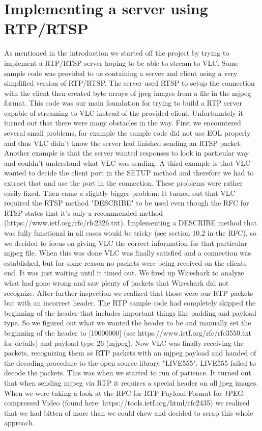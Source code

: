 \documentclass[a4paper]{article}
\begin{document}
\section{Implementing a server using RTP/RTSP}
As mentioned in the introduction we started off the project by trying to implement a RTP/RTSP server hoping to be able to stream to VLC. 
Some sample code was provided to us containing a server and client using a very simplified version of RTP/RTSP. The server used RTSP to setup the connection with the client then created byte arrays of jpeg images from a file in the mjpeg format.
This code was our main foundation for trying to build a RTP server capable of streaming to VLC instead of the provided client. Unfortunately it turned out that there were many obstacles in the way.
First we encountered several small problems, for example the sample code did not use EOL properly and thus VLC didn't know the server had finished sending an RTSP packet. Another example is that the server wanted responses to look in particular way and couldn't understand what VLC was sending.
A third example is that VLC wanted to decide the client port in the SETUP method and therefore we had to extract that and use the port in the connection.
These problems were rather easily fixed. Then came a slightly bigger problem: It turned out that VLC required the RTSP method "DESCRIBE" to be used even though the RFC for RTSP states that it's only a recommended method  (https://www.ietf.org/rfc/rfc2326.txt).
Implementing a DESCRIBE method that was fully functional in all cases would be tricky (see section 10.2 in the RFC), so we decided to focus on giving VLC the correct information for that particular mjpeg file. 
When this was done VLC was finally satisfied and a connection was established, but for some reason no packets were being received on the clients end. It was just waiting until it timed out.
We fired up Wireshark to analyze what had gone wrong and saw plenty of packets that Wireshark did not recognize. After further inspection we realized that those were our RTP packets but with an incorrect header.
The RTP sample code had completely skipped the beginning of the header that includes important things like padding and payload type. So we figured out what we wanted the header to be and manually set the beginning of the header to [10000000] (see https://www.ietf.org/rfc/rfc3550.txt for details) and payload type 26 (mjpeg).
Now VLC was finally receiving the packets, recognizing them as RTP packets with an mjpeg payload and handed of the decoding procedure to the open source library "LIVE555".
LIVE555 failed to decode the packets. This was when we started to run of patience. It turned out that when sending mjpeg via RTP it requires a special header on all jpeg images. 
When we were taking a look at the RFC for RTP Payload Format for JPEG-compressed Video (found here: https://tools.ietf.org/html/rfc2435) we realized that we had bitten of more than we could chew and decided to scrap this whole approach.
\end{document}
